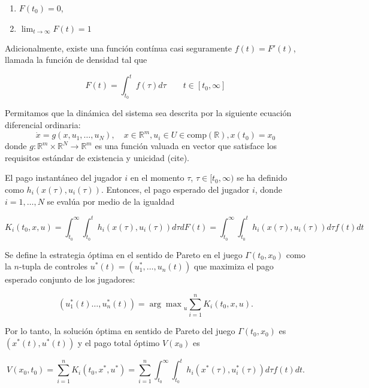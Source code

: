 \documentclass[11pt, oneside]{article}
\begin{document}
\begin{enumerate}
	\item $F(t_0) = 0$,
	\item $\lim_{t\to\infty}F(t)=1$
\end{enumerate}

Adicionalmente, existe una función contínua casi seguramente $f(t) = F'(t)$, llamada la función de densidad tal que

\begin{equation}
	F(t) = \int_{t_0}^t f(\tau)d\tau \qquad t \in [t_0,\infty]
\end{equation}

Permitamos que la dinámica del sistema sea descrita por la siguiente ecuación diferencial ordinaria:
\begin{equation}
	\dot{x} = g(x, u_1,\dots,u_N), \quad x\in\mathbb{R}^m, u_i \in U\in \mbox{comp}(\mathbb{R}), x(t_0) = x_0
\end{equation}
donde $g : \mathbb{R}^m\times \mathbb{R}^N \to \mathbb{R}^m$ es una función valuada en vector que satisface los requisitos estándar de existencia y unicidad (cite).

El pago instantáneo del jugador $i$ en el momento $\tau$, $\tau \in [t_0,\infty)$ se ha definido como $h_i(x(\tau), u_i(\tau))$. Entonces, el pago esperado del jugador $i$, donde $i = 1,\dots,N$ se evalúa por medio de la igualdad

\begin{equation}
	K_i(t_0, x, u) = \int_{t_0}^\infty\int_{t_0}^t h_i(x(\tau), u_i(\tau)) d\tau dF(t) = \int_{t_0}^\infty\int_{t_0}^t h_i(x(\tau), u_i(\tau)) d\tau f(t) dt
\end{equation}

Se define la estrategia óptima en el sentido de Pareto en el juego $\Gamma(t_0,x_0)$ como la $n$-tupla de controles $u^*(t) = (u_1^*, \dots, u_n(t))$ que maximiza el pago esperado conjunto de los jugadores:

\begin{equation}
	(u_1^*(t)\dots,u_n^*(t)) = {\arg\max}_u \sum_{i=1}^nK_i(t_0,x,u).
\end{equation}

Por lo tanto, la solución óptima en sentido de Pareto del juego $\Gamma(t_0,x_0)$ es $(x^*(t), u^*(t))$ y el pago total óptimo $V(x_0)$ es

\begin{equation}
	V(x_0, t_0) = \sum_{i=1}^n K_i(t_0,x^*,u^*) = \sum_{i=1}^n \int_{t_0}^\infty \int_{t_0}^t h_i(x^*(\tau), u_i^*(\tau))d\tau f(t)dt.
\end{equation}
\end{document}
